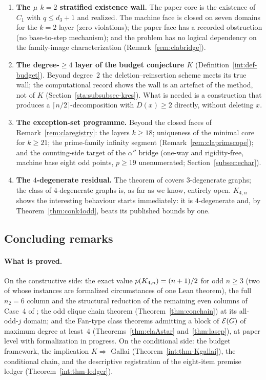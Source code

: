 \begin{enumerate}[label=\textbf{O\arabic*.},leftmargin=2.4em]
constructive one-leak theorem; the obstruction is $C_2$-side
reachability, with the three registered empirical obstacles and the
candidate mechanisms of Section~\ref{sta:subsubsec-gapex}, each carrying
its falsification experiment.
\item \textbf{The $\mu$ $k=2$ stratified existence wall.} The paper core
is the existence of $C_1$ with $q\le d_3+1$ and realized. The machine
face is closed on seven domains for the $k=2$ layer (zero violations);
the paper face has a recorded obstruction (no base-to-step mechanism);
and the problem has no logical dependency on the family-image
characterization (Remark~\ref{rem:clabridge}).
\item \textbf{The degree-$\ge4$ layer of the budget conjecture
$K$} (Definition~\ref{int:def-budget}). Beyond degree~$2$ the
deletion--reinsertion scheme meets its true wall; the computational
record shows the wall is an artefact of the method, not of $K$
(Section~\ref{sta:subsubsec-kres}). What is needed is a construction that
produces a $\lceil n/2\rceil$-decomposition with $D(x)\ge2$ directly,
without deleting $x$.
\item \textbf{The exception-set programme.} Beyond the closed faces of
Remark~\ref{rem:claregistry}: the layers $k\ge18$; uniqueness of the
minimal core for $k\ge21$; the prime-family infinity segment
(Remark~\ref{rem:claprimscope}); and the counting-side target of the
$\alpha''$ bridge (one-way and rigidity-free, machine base eight odd
points, $p\ge19$ unenumerated; Section~\ref{subsec:echar}).
\item \textbf{The $4$-degenerate residual.} The theorem of
\cite{ZLH24} covers $3$-degenerate graphs; the class of
$4$-degenerate graphs is, as far as we know, entirely open.
$K_{4,n}$ shows the interesting behaviour starts immediately: it is
$4$-degenerate and, by Theorem~\ref{thm:conk4odd}, beats its published
bounds by one.
\end{enumerate}

\subsection{Concluding remarks}\label{sta:subsec-conclusion}

\paragraph{What is proved.} On the constructive side: the exact value
$p(K_{4,n})=(n+1)/2$ for odd $n\ge3$ (two of whose instances are
formalized circumstances of one Lean theorem), the full $n_2=6$ column
and the structural reduction of the remaining even columns of Case~4 of
\cite{CE18}; the odd clique chain theorem
(Theorem~\ref{thm:conchain}) at its all-odd-$j$ domain; and the Fan-type
class theorems admitting a block of $\mathcal{E}(G)$ of maximum degree at
least~$4$ (Theorems~\ref{thm:claAstar} and~\ref{thm:lasep}), at paper
level with formalization in progress. On the conditional side: the
budget framework, the implication $K\Rightarrow$ Gallai
(Theorem~\ref{int:thm-Kgallai}), the conditional chain, and the
descriptive registration of the eight-item premise ledger
(Theorem~\ref{int:thm-ledger}).

